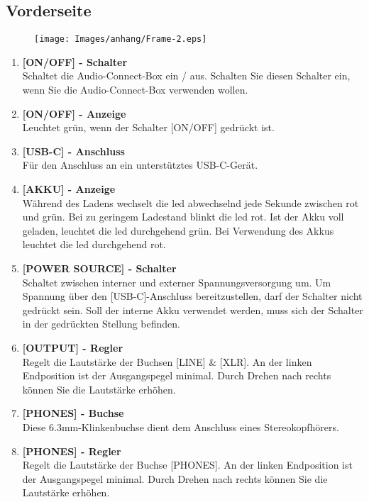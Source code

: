 \subsection{Vorderseite}
    \begin{figure}[H]
        \centering
        \texttt{[image: Images/anhang/Frame-2.eps]}
        \caption*{}
    \end{figure}
\begin{multicols}{2}
    \begin{enumerate}
        \item[\ding{202}] \textbf{[ON/OFF] - Schalter}    \\
            Schaltet die Audio-Connect-Box ein / aus. 
            Schalten Sie diesen Schalter ein, wenn Sie die Audio-Connect-Box verwenden wollen.
        \item[\ding{203}] \textbf{[ON/OFF] - Anzeige}    \\
            Leuchtet grün, wenn der Schalter [ON/OFF] gedrückt ist.
        \item[\ding{204}] \textbf{[USB-C] - Anschluss}    \\
            Für den Anschluss an ein unterstütztes USB-C-Gerät.
        \item[\ding{205}] \textbf{[AKKU] - Anzeige}    \\
            Während des Ladens wechselt die \ac{led} abwechselnd jede Sekunde zwischen rot und grün.
            Bei zu geringem Ladestand blinkt die \ac{led} rot. Ist der Akku voll geladen, leuchtet die \ac{led} durchgehend grün.
            Bei Verwendung des Akkus leuchtet die \ac{led} durchgehend rot.
        \item[\ding{206}] \textbf{[POWER SOURCE] - Schalter}    \\
            Schaltet zwischen interner und externer Spannungsversorgung um. 
            Um Spannung über den [USB-C]-Anschluss bereitzustellen, darf der Schalter nicht gedrückt sein.
            Soll der interne Akku verwendet werden, muss sich der Schalter in der gedrückten Stellung befinden.
        \item[\ding{207}] \textbf{[OUTPUT] - Regler}    \\
            Regelt die Lautstärke der Buchsen [LINE] \& [XLR]. 
            An der linken Endposition ist der Ausgangspegel minimal. 
            Durch Drehen nach rechts können Sie die Lautstärke erhöhen.
        \item[\ding{208}] \textbf{[PHONES] - Buchse}    \\
            Diese 6.3mm-Klinkenbuchse dient dem Anschluss eines Stereokopfhörers.
        \item[\ding{209}] \textbf{[PHONES] - Regler}    \\
            Regelt die Lautstärke der Buchse [PHONES]. 
            An der linken Endposition ist der Ausgangspegel minimal. 
            Durch Drehen nach rechts können Sie die Lautstärke erhöhen.
    \end{enumerate}
\end{multicols}

